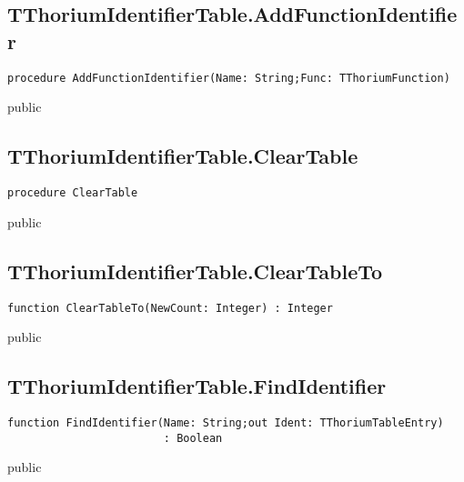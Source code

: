 \subsection{TThoriumIdentifierTable.AddFunctionIdentifier}
\label{thoriumcorepkg:thorium:tthoriumidentifiertable:addfunctionidentifier}
\begin{FPCList}
\Declaration 

\begin{verbatim}
procedure AddFunctionIdentifier(Name: String;Func: TThoriumFunction)
\end{verbatim}
\Visibility
public
\end{FPCList}
\subsection{TThoriumIdentifierTable.ClearTable}
\label{thoriumcorepkg:thorium:tthoriumidentifiertable:cleartable}
\begin{FPCList}
\Declaration 

\begin{verbatim}
procedure ClearTable
\end{verbatim}
\Visibility
public
\end{FPCList}
\subsection{TThoriumIdentifierTable.ClearTableTo}
\label{thoriumcorepkg:thorium:tthoriumidentifiertable:cleartableto}
\begin{FPCList}
\Declaration 

\begin{verbatim}
function ClearTableTo(NewCount: Integer) : Integer
\end{verbatim}
\Visibility
public
\end{FPCList}
\subsection{TThoriumIdentifierTable.FindIdentifier}
\label{thoriumcorepkg:thorium:tthoriumidentifiertable:findidentifier}
\begin{FPCList}
\Declaration 

\begin{verbatim}
function FindIdentifier(Name: String;out Ident: TThoriumTableEntry)
                        : Boolean
\end{verbatim}
\Visibility
public
\end{FPCList}
